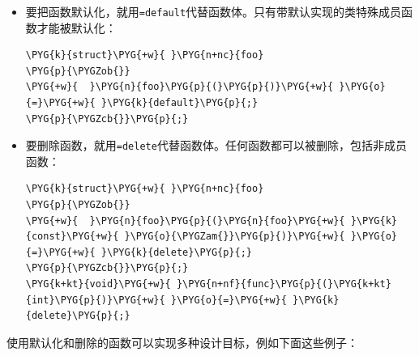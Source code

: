 \begin{itemize}
\item 要把函数默认化，就用\texttt{=default}代替函数体。只有带默认实现的类特殊成员函数才能被默认化：



\begin{codeblockbg}
\begin{Verbatim}[commandchars=\\\{\},breaklines=true,breakanywhere=true,fontsize=\codefont,xleftmargin=17bp]
\PYG{k}{struct}\PYG{+w}{ }\PYG{n+nc}{foo}
\PYG{p}{\PYGZob{}}
\PYG{+w}{  }\PYG{n}{foo}\PYG{p}{(}\PYG{p}{)}\PYG{+w}{ }\PYG{o}{=}\PYG{+w}{ }\PYG{k}{default}\PYG{p}{;}
\PYG{p}{\PYGZcb{}}\PYG{p}{;}
\end{Verbatim}
\end{codeblockbg}



\item 要删除函数，就用\texttt{=delete}代替函数体。任何函数都可以被删除，包括非成员函数：



\begin{codeblockbg}
\begin{Verbatim}[commandchars=\\\{\},breaklines=true,breakanywhere=true,fontsize=\codefont,xleftmargin=17bp]
\PYG{k}{struct}\PYG{+w}{ }\PYG{n+nc}{foo}
\PYG{p}{\PYGZob{}}
\PYG{+w}{  }\PYG{n}{foo}\PYG{p}{(}\PYG{n}{foo}\PYG{+w}{ }\PYG{k}{const}\PYG{+w}{ }\PYG{o}{\PYGZam{}}\PYG{p}{)}\PYG{+w}{ }\PYG{o}{=}\PYG{+w}{ }\PYG{k}{delete}\PYG{p}{;}
\PYG{p}{\PYGZcb{}}\PYG{p}{;}
\PYG{k+kt}{void}\PYG{+w}{ }\PYG{n+nf}{func}\PYG{p}{(}\PYG{k+kt}{int}\PYG{p}{)}\PYG{+w}{ }\PYG{o}{=}\PYG{+w}{ }\PYG{k}{delete}\PYG{p}{;}
\end{Verbatim}
\end{codeblockbg}

\end{itemize}



使用默认化和删除的函数可以实现多种设计目标，例如下面这些例子：



